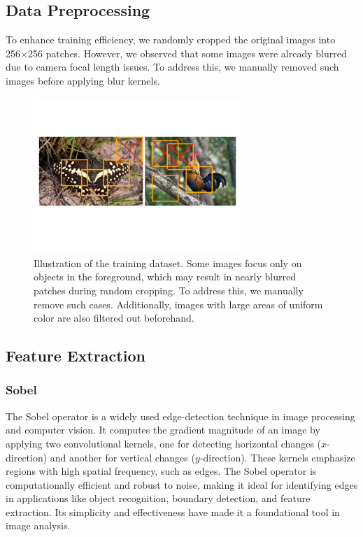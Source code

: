 \documentclass[twoside,11pt]{article}
\begin{document}
\subsection{Data Preprocessing}
To enhance training efficiency, we randomly cropped the original images into 256×256 patches. However, we observed that some images were already blurred due to camera focal length issues. To address this, we manually removed such images before applying blur kernels.

\begin{figure}[H]
\centering
\includegraphics[width=0.7\textwidth]{figure1.jpg}
\caption{Illustration of the training dataset. Some images focus only on objects in the foreground, which may result in nearly blurred patches during random cropping. To address this, we manually remove such cases. Additionally, images with large areas of uniform color are also filtered out beforehand.}
\end{figure}

\subsection{Feature Extraction}

\subsubsection{Sobel}
The Sobel operator is a widely used edge-detection technique in image processing and computer vision. It computes the gradient magnitude of an image by applying two convolutional kernels, one for detecting horizontal changes (\(x\)-direction) and another for vertical changes (\(y\)-direction). These kernels emphasize regions with high spatial frequency, such as edges. The Sobel operator is computationally efficient and robust to noise, making it ideal for identifying edges in applications like object recognition, boundary detection, and feature extraction. Its simplicity and effectiveness have made it a foundational tool in image analysis.
\end{document}
